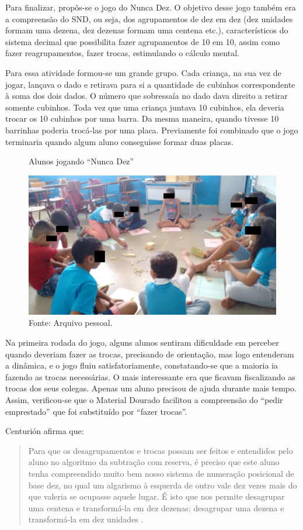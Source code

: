\begin{refsection}
    Para finalizar, propôs-se o jogo do Nunca Dez. O objetivo desse jogo também era a compreensão do SND, ou seja, dos agrupamentos de dez em dez (dez unidades formam uma dezena, dez dezenas formam uma centena etc.), característicos do sistema decimal que possibilita fazer agrupamentos de 10 em 10, assim como fazer reagrupamentos, fazer trocas, estimulando o cálculo mental.  

    Para essa atividade formou-se um grande grupo. Cada criança, na sua vez de jogar, lançava o dado e retirava para si a quantidade de cubinhos correspondente à soma dos dois dados. O número que sobressaía no dado dava direito a retirar somente cubinhos. Toda vez que uma criança juntava 10 cubinhos, ela deveria trocar os 10 cubinhos por uma barra. Da mesma maneira, quando tivesse 10 barrinhas poderia trocá-las por uma placa. Previamente foi combinado que o jogo terminaria quando algum aluno conseguisse formar duas placas. 

    \begin{figure}[ht]%
        \centering%
        \caption{Alunos jogando ``Nunca Dez''}%
        \includegraphics[width=.5\textwidth]{articles/05-material-dourado-com/figura4.jpeg}%
        \caption*{Fonte: Arquivo pessoal.}%
        \label{fig:nunca-dez}%
    \end{figure}%

    Na primeira rodada do jogo, alguns alunos sentiram dificuldade em perceber quando deveriam fazer as trocas, precisando de orientação, mas logo entenderam a dinâmica, e o jogo fluiu satisfatoriamente, constatando-se que a maioria ia fazendo as trocas necessárias. O mais interessante era que ficavam fiscalizando as trocas dos seus colegas. Apenas um aluno precisou de ajuda durante mais tempo. Assim, verificou-se que o Material Dourado facilitou a compreensão do “pedir emprestado” que foi substituído por “fazer trocas”.  

    Centurión afirma que:  

    \begin{quotation}
        Para que os desagrupamentos e trocas possam ser feitos e entendidos pelo aluno no algoritmo da subtração com reserva, é preciso que este aluno tenha compreendido muito bem nosso sistema de numeração posicional de base dez, no qual um algarismo à esquerda de outro vale dez vezes mais do que valeria se ocupasse aquele lugar. É isto que nos permite desagrupar uma centena e transformá-la em dez dezenas; desagrupar uma dezena e trans\-for\-má-la em dez unidades \cite[p.~186]{CENTURIÓN1995Números}.
    \end{quotation}


\end{refsection}
